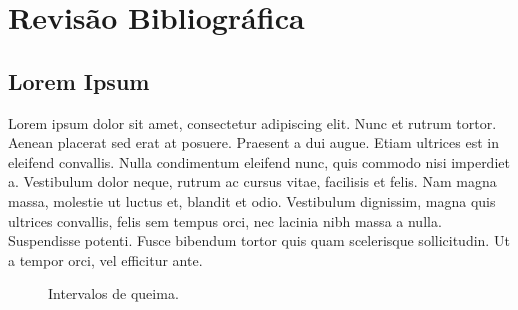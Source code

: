 \chapter{Revisão Bibliográfica}
\label{chap2}

\section{Lorem Ipsum}

Lorem ipsum dolor sit amet, consectetur adipiscing elit. Nunc et rutrum tortor. Aenean placerat sed erat at posuere. Praesent a dui augue. Etiam ultrices est in eleifend convallis. Nulla condimentum eleifend nunc, quis commodo nisi imperdiet a. Vestibulum dolor neque, rutrum ac cursus vitae, facilisis et felis. Nam magna massa, molestie ut luctus et, blandit et odio. Vestibulum dignissim, magna quis ultrices convallis, felis sem tempus orci, nec lacinia nibh massa a nulla. Suspendisse potenti. Fusce bibendum tortor quis quam scelerisque sollicitudin. Ut a tempor orci, vel efficitur ante.

\begin{figure}[H]
  \centering
  \label{chap2:timeline}
  \caption{Intervalos de queima.}  
  \end{figure}

